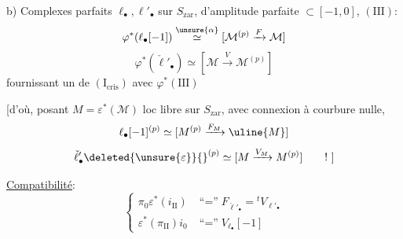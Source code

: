 b) Complexes parfaits $\ell_{\bullet},\ell'_{\bullet}$ sur $S_{\mathrm{zar}}$, d'amplitude parfaite $\subset[-1,0]$,   $(\mathrm {III})$:
\[
\varphi^*(\ell_{\bullet}[-1])\overset{\unsure{\alpha}}\simeq[\mathcal M^{(p)}\xrightarrow{F}\mathcal M]
\]
\[
\varphi^*(\check\ell'_{\bullet})\simeq[\mathcal M\xrightarrow{V}\mathcal M^{(p)}]
\]
fournissant un   de $(\mathrm I_{\mathrm{cris}})$ avec $\varphi^*(\mathrm {III})$

\deleted{\unsure{[}} [d'où, posant $M=\varepsilon^*(\mathcal M)$ loc libre sur $S_{\mathrm{zar}}$, avec connexion à courbure nulle,
\[
\ell_{\bullet}[-1]^{(p)}\simeq[M^{(p)}\xrightarrow{F_M}\uline{M}]
\]
\[
\check\ell'_{\bullet}\deleted{\unsure{\varepsilon}}{}^{(p)}\simeq[M\xrightarrow{V_M}M^{(p)}]\qquad !\ ]
\]

\uline{Compatibilité}: 
\[
\left\{\begin{aligned}
\pi_0\varepsilon^*(i_{\mathrm {II}})&\mathrel{\text{``$=$''}}F_{\check\ell'_{\bullet}}={}^tV_{\ell'_{\bullet}}\\
\varepsilon^*(\pi_{\mathrm {II}})i_0&\mathrel{\text{``$=$''}}V_{\ell_{\bullet}}[-1]
\end{aligned}\right.
\]
